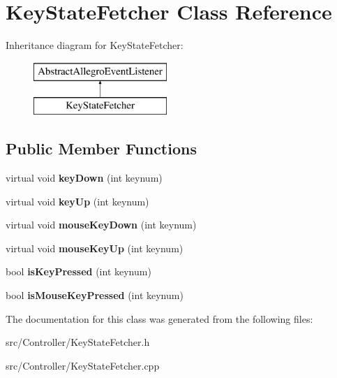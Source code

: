 \hypertarget{classKeyStateFetcher}{}\section{Key\+State\+Fetcher Class Reference}
\label{classKeyStateFetcher}
Inheritance diagram for Key\+State\+Fetcher\+:\begin{figure}[H]
\begin{center}
\leavevmode
\includegraphics[height=2.000000cm]{classKeyStateFetcher}
\end{center}
\end{figure}
\subsection*{Public Member Functions}
\begin{DoxyCompactItemize}
\item 
virtual void {\bfseries key\+Down} (int keynum)\hypertarget{classKeyStateFetcher_a7a9aeebf39efa3f21ae9f7c4891b61d3}{}\label{classKeyStateFetcher_a7a9aeebf39efa3f21ae9f7c4891b61d3}

\item 
virtual void {\bfseries key\+Up} (int keynum)\hypertarget{classKeyStateFetcher_a5a9b16ca560c2c4ee57054a4d46b75cb}{}\label{classKeyStateFetcher_a5a9b16ca560c2c4ee57054a4d46b75cb}

\item 
virtual void {\bfseries mouse\+Key\+Down} (int keynum)\hypertarget{classKeyStateFetcher_af7fbf8c83670c72943003e7ac4bcd764}{}\label{classKeyStateFetcher_af7fbf8c83670c72943003e7ac4bcd764}

\item 
virtual void {\bfseries mouse\+Key\+Up} (int keynum)\hypertarget{classKeyStateFetcher_afcaa388a5d5d943846ebe44340792970}{}\label{classKeyStateFetcher_afcaa388a5d5d943846ebe44340792970}

\item 
bool {\bfseries is\+Key\+Pressed} (int keynum)\hypertarget{classKeyStateFetcher_a95a6cc58769c9c81be7d4fe02979f8e3}{}\label{classKeyStateFetcher_a95a6cc58769c9c81be7d4fe02979f8e3}

\item 
bool {\bfseries is\+Mouse\+Key\+Pressed} (int keynum)\hypertarget{classKeyStateFetcher_a497bb9b944cecfe2d99f7a5b050864d3}{}\label{classKeyStateFetcher_a497bb9b944cecfe2d99f7a5b050864d3}

\end{DoxyCompactItemize}


The documentation for this class was generated from the following files\+:\begin{DoxyCompactItemize}
\item 
src/\+Controller/Key\+State\+Fetcher.\+h\item 
src/\+Controller/Key\+State\+Fetcher.\+cpp\end{DoxyCompactItemize}
